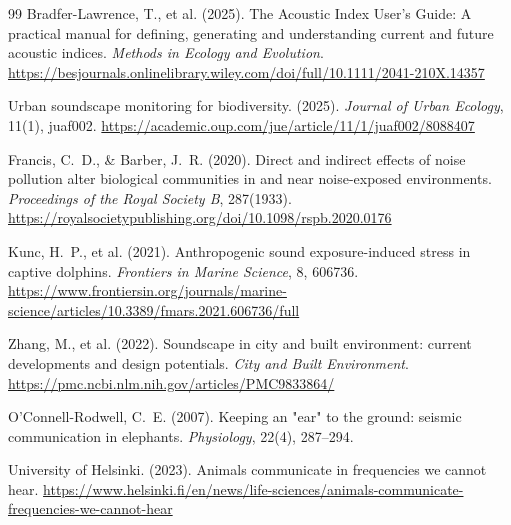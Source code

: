 \documentclass[12pt, a4paper]{article}
\begin{document}
\begin{thebibliography}{99}
Bradfer-Lawrence, T., et al. (2025).
The Acoustic Index User's Guide: A practical manual for defining, generating and understanding
current and future acoustic indices.
\textit{Methods in Ecology and Evolution}.
\url{https://besjournals.onlinelibrary.wiley.com/doi/full/10.1111/2041-210X.14357}

Urban soundscape monitoring for biodiversity. (2025).
\textit{Journal of Urban Ecology}, 11(1), juaf002.
\url{https://academic.oup.com/jue/article/11/1/juaf002/8088407}

Francis, C.~D., \& Barber, J.~R. (2020).
Direct and indirect effects of noise pollution alter biological communities in and near
noise-exposed environments.
\textit{Proceedings of the Royal Society B}, 287(1933).
\url{https://royalsocietypublishing.org/doi/10.1098/rspb.2020.0176}

Kunc, H.~P., et al. (2021).
Anthropogenic sound exposure-induced stress in captive dolphins.
\textit{Frontiers in Marine Science}, 8, 606736.
\url{https://www.frontiersin.org/journals/marine-science/articles/10.3389/fmars.2021.606736/full}

Zhang, M., et al. (2022).
Soundscape in city and built environment: current developments and design potentials.
\textit{City and Built Environment}.
\url{https://pmc.ncbi.nlm.nih.gov/articles/PMC9833864/}

O'Connell-Rodwell, C.~E. (2007).
Keeping an "ear" to the ground: seismic communication in elephants.
\textit{Physiology}, 22(4), 287--294.

University of Helsinki. (2023).
Animals communicate in frequencies we cannot hear.
\url{https://www.helsinki.fi/en/news/life-sciences/animals-communicate-frequencies-we-cannot-hear}

\end{thebibliography}
\end{document}
